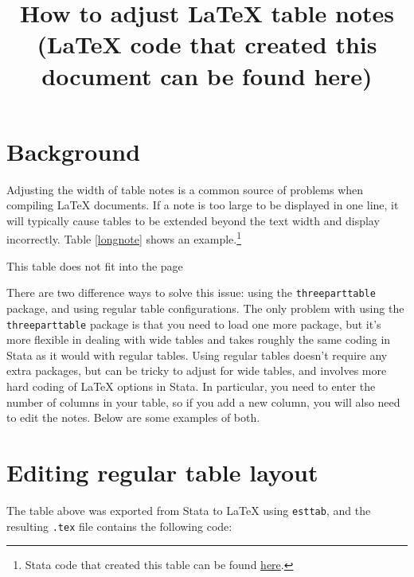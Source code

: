 \documentclass[11pt,a4paper]{article}
\title{How to adjust LaTeX table notes \\  \large ({\LaTeX} code that created this document can be found here)}
\begin{document}
\maketitle
\section{Background}

Adjusting the width of table notes is a common source of problems when compiling {\LaTeX} documents. If a note is too large to be displayed in one line, it will typically cause tables to be extended beyond the text width and display incorrectly. Table \ref{longnote} shows an example.\footnote{Stata code that created this table can be found \href{https://gist.github.com/luizaandrade/83bc1bae403a50616c82dd33c54b57b3}{here}.}

\begin{table}[H]
	\caption{This table does not fit into the page}
	\label{longnote}
	
\end{table}

There are two difference ways to solve this issue: using the \texttt{threeparttable} package, and using regular table configurations. The only problem with using the \texttt{threeparttable} package is that you need to load one more package, but it's more flexible in dealing with wide tables and takes roughly the same coding in Stata as it would with regular tables. Using regular tables doesn't require any extra packages, but can be tricky to adjust for wide tables, and involves more hard coding of {\LaTeX} options in Stata. In particular, you need to enter the number of columns in your table, so if you add a new column, you will also need to edit the notes. Below are some examples of both.

\section{Editing regular table layout}

The table above was exported from Stata to {\LaTeX} using \texttt{esttab}, and the resulting \texttt{.tex} file contains the following code:
\end{document}
